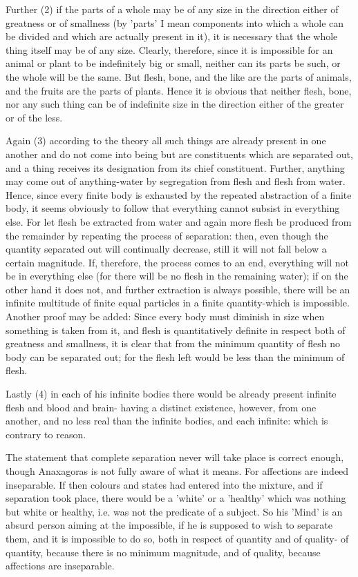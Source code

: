 Further (2) if the parts of a whole may be of any size in the direction
either of greatness or of smallness (by 'parts' I mean components
into which a whole can be divided and which are actually present in
it), it is necessary that the whole thing itself may be of any size.
Clearly, therefore, since it is impossible for an animal or plant
to be indefinitely big or small, neither can its parts be such, or
the whole will be the same. But flesh, bone, and the like are the
parts of animals, and the fruits are the parts of plants. Hence it
is obvious that neither flesh, bone, nor any such thing can be of
indefinite size in the direction either of the greater or of the less.

Again (3) according to the theory all such things are already present
in one another and do not come into being but are constituents which
are separated out, and a thing receives its designation from its chief
constituent. Further, anything may come out of anything-water by segregation
from flesh and flesh from water. Hence, since every finite body is
exhausted by the repeated abstraction of a finite body, it seems obviously
to follow that everything cannot subsist in everything else. For let
flesh be extracted from water and again more flesh be produced from
the remainder by repeating the process of separation: then, even though
the quantity separated out will continually decrease, still it will
not fall below a certain magnitude. If, therefore, the process comes
to an end, everything will not be in everything else (for there will
be no flesh in the remaining water); if on the other hand it does
not, and further extraction is always possible, there will be an infinite
multitude of finite equal particles in a finite quantity-which is
impossible. Another proof may be added: Since every body must diminish
in size when something is taken from it, and flesh is quantitatively
definite in respect both of greatness and smallness, it is clear that
from the minimum quantity of flesh no body can be separated out; for
the flesh left would be less than the minimum of flesh. 

Lastly (4) in each of his infinite bodies there would be already present
infinite flesh and blood and brain- having a distinct existence, however,
from one another, and no less real than the infinite bodies, and each
infinite: which is contrary to reason. 

The statement that complete separation never will take place is correct
enough, though Anaxagoras is not fully aware of what it means. For
affections are indeed inseparable. If then colours and states had
entered into the mixture, and if separation took place, there would
be a 'white' or a 'healthy' which was nothing but white or healthy,
i.e. was not the predicate of a subject. So his 'Mind' is an absurd
person aiming at the impossible, if he is supposed to wish to separate
them, and it is impossible to do so, both in respect of quantity and
of quality- of quantity, because there is no minimum magnitude, and
of quality, because affections are inseparable. 

